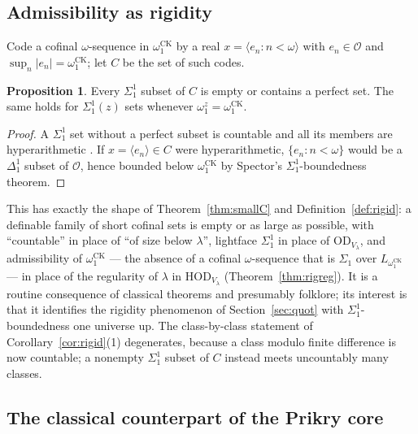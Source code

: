 \documentclass[11pt,letterpaper]{article}
\theoremstyle{definition}
\newtheorem{proposition}[definition]{Proposition}
\numberwithin{equation}{section}
\newcommand{\HOD}{\mathrm{HOD}}
\newcommand{\OD}{\mathrm{OD}}
\begin{document}
\subsection{Admissibility as rigidity}

Code a cofinal $\omega$-sequence in $\omega_1^{\mathrm{CK}}$ by a real $x=\langle e_n:n<\omega\rangle$ with $e_n\in\mathcal O$ and $\sup_n|e_n|=\omega_1^{\mathrm{CK}}$; let $C$ be the set of such codes.

\begin{proposition}\label{prop:ck}
Every $\Sigma^1_1$ subset of $C$ is empty or contains a perfect set. The same holds for $\Sigma^1_1(z)$ sets whenever $\omega_1^z=\omega_1^{\mathrm{CK}}$.
\end{proposition}

\begin{proof}
A $\Sigma^1_1$ set without a perfect subset is countable and all its members are hyperarithmetic \cite[Ch.~III]{sacks}. If $x=\langle e_n\rangle\in C$ were hyperarithmetic, $\{e_n:n<\omega\}$ would be a $\Delta^1_1$ subset of $\mathcal O$, hence bounded below $\omega_1^{\mathrm{CK}}$ by Spector's $\Sigma^1_1$-boundedness theorem.
\end{proof}

This has exactly the shape of Theorem~\ref{thm:smallC} and Definition~\ref{def:rigid}: a definable family of short cofinal sets is empty or as large as possible, with ``countable'' in place of ``of size below $\lambda$'', lightface $\Sigma^1_1$ in place of $\OD_{V_\lambda}$, and admissibility of $\omega_1^{\mathrm{CK}}$ --- the absence of a cofinal $\omega$-sequence that is $\Sigma_1$ over $L_{\omega_1^{\mathrm{CK}}}$ --- in place of the regularity of $\lambda$ in $\HOD_{V_\lambda}$ (Theorem~\ref{thm:rigreg}). It is a routine consequence of classical theorems and presumably folklore; its interest is that it identifies the rigidity phenomenon of Section~\ref{sec:quot} with $\Sigma^1_1$-boundedness one universe up. The class-by-class statement of Corollary~\ref{cor:rigid}(1) degenerates, because a class modulo finite difference is now countable; a nonempty $\Sigma^1_1$ subset of $C$ instead meets uncountably many classes.

\subsection{The classical counterpart of the Prikry core}
\end{document}
